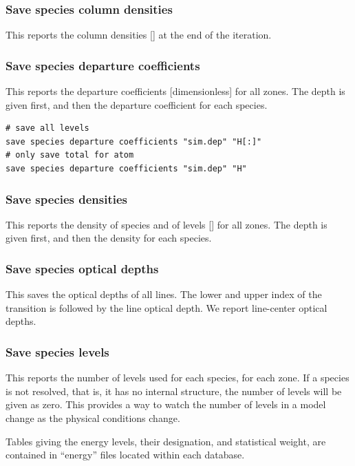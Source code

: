 \subsubsection{Save species column densities}
This reports the column densities [\pscm] at the end of the iteration.

\subsubsection{Save species departure coefficients}
This reports the departure coefficients [dimensionless] for all zones.
The depth is given first, and then the departure coefficient for each
species.

\begin{verbatim}
# save all levels
save species departure coefficients "sim.dep" "H[:]" 
# only save total for atom
save species departure coefficients "sim.dep" "H" 
\end{verbatim}

\subsubsection{Save species densities}
This reports the density of species and of levels [\pccm] for all zones.
The depth is given first, and then the density for each species.

\subsubsection{Save species optical depths}
This saves the optical depths of all lines.
The lower and upper index of the transition is followed by
the line optical depth.
We report line-center optical depths.

\subsubsection{Save species levels}
This reports the number of levels used for each species, for each zone.
If a species is not resolved, that is, it has no internal structure,
the number of levels will be given as zero.
This provides a way to watch the number of levels in a model change
as the physical conditions change.

Tables giving the energy levels, their designation, and statistical weight,
are contained in ``energy'' files located within each database.

